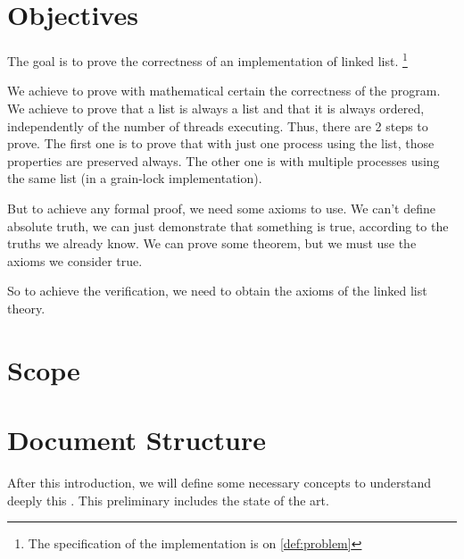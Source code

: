 \section{Objectives}

The goal is to prove the correctness of an implementation of linked list. \footnote{The specification of the implementation is on \ref{def:problem}}

We achieve to prove with mathematical certain the correctness of the program. We achieve to prove that a list is always a list and that it is always ordered, independently of the number of threads executing. Thus, there are 2 steps to prove. The first one is to prove that with just one process using the list, those properties are preserved always. The other one is with multiple processes using the same list (in a grain-lock implementation).

But to achieve any formal proof, we need some axioms to use.
We can't define absolute truth, we can just demonstrate that something is true, according to the truths we already know. 
We can prove some theorem, but we must use the axioms we consider true. 

So to achieve the verification, we need to obtain the axioms of the linked list theory.

\section{Scope}


\label{def:leap}

\section{Document Structure}

After this introduction, we will define some necessary concepts to understand deeply this \thisworkm. This preliminary includes the state of the art.

